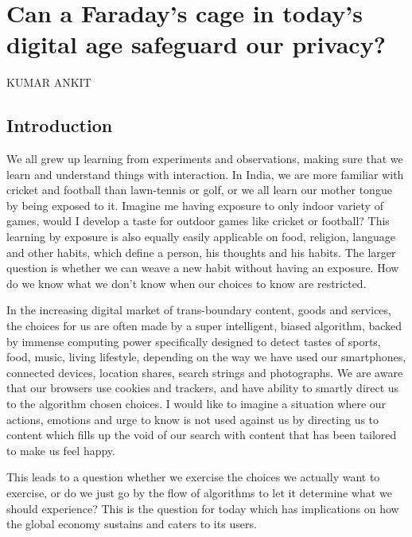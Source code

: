 \chapter{Can a Faraday’s cage in today’s digital age safeguard our privacy?}
\vskip -15pt


\begin{center}
{\large\uppercase{Kumar Ankit}} 


\end{center}

\vskip 2.3cm



\vfill
\newpage

\begin{multicols}{2}

\section{Introduction}

We all grew up learning from experiments and observations, making sure that we learn and understand things with interaction. In India, we are more familiar with cricket and football than lawn-tennis or golf, or we all learn our mother tongue by being exposed to it. Imagine me having exposure to only indoor variety of games, would I develop a taste for outdoor games like cricket or football? This learning by exposure is also equally easily applicable on food, religion, language and other habits, which define a person, his thoughts and his habits. The larger question is whether we can weave a new habit without having an exposure. How do we know what we don’t know when our choices to know are restricted. 

In the increasing digital market of trans-boundary content, goods and services, the choices for us are often made by a super intelligent, biased algorithm, backed by immense computing power specifically designed to detect tastes of sports, food, music, living lifestyle, depending on the way we have used our smartphones, connected devices, location shares, search strings and photographs. We are aware that our browsers use cookies and trackers, and have ability to smartly direct us to the algorithm chosen choices. I would like to imagine a situation where our actions, emotions and urge to know is not used against us by directing us to content which fills up the void of our search with content that has been tailored to make us feel happy.

This leads to a question whether we exercise the choices we actually want to exercise, or do we just go by the flow of algorithms to let it determine what we should experience? This is the question for today which has implications on how the global economy sustains and caters to its users.


\end{multicols}
